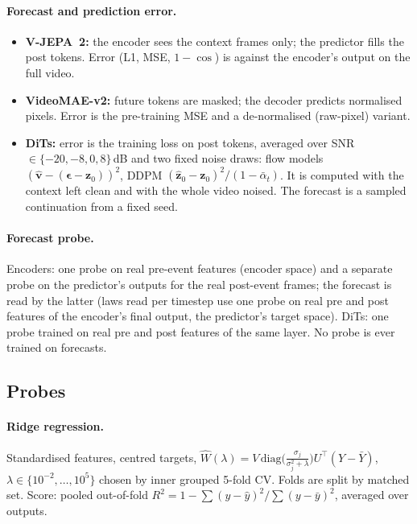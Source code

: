 \documentclass[10pt]{article}
\begin{document}
\paragraph{Forecast and prediction error.}
\begin{itemize}
\item \textbf{V-JEPA~2:} the encoder sees the context frames only; the predictor fills the post tokens. Error (L1,
MSE, $1-\cos$) is against the encoder's output on the full video.
\item \textbf{VideoMAE-v2:} future tokens are masked; the decoder predicts normalised pixels. Error is the
pre-training MSE and a de-normalised (raw-pixel) variant.
\item \textbf{DiTs:} error is the training loss on post tokens, averaged over SNR $\in\{-20,-8,0,8\}$\,dB and two
fixed noise draws: flow models $(\hat{\mathbf v}-(\boldsymbol\epsilon-\mathbf z_0))^2$, DDPM
$(\hat{\mathbf z}_0-\mathbf z_0)^2/(1-\bar\alpha_t)$. It is computed with the context left clean and with the whole video noised.
The forecast is a sampled continuation from a fixed seed.
\end{itemize}

\paragraph{Forecast probe.} Encoders: one probe on real pre-event features (encoder space) and a separate probe on the
predictor's outputs for the real post-event frames; the forecast is read by the latter (laws read per timestep use one
probe on real pre and post features of the encoder's final output, the predictor's target space). DiTs: one
probe trained on real pre and post features of the same layer. No probe is ever trained on forecasts.

\subsection{Probes}
\label{sec:probe}
\paragraph{Ridge regression.} Standardised features, centred targets,
$\hat W(\lambda)=V\,\mathrm{diag}\big(\frac{\sigma_j}{\sigma_j^2+\lambda}\big)U^\top(Y-\bar Y)$,
$\lambda\in\{10^{-2},\dots,10^5\}$ chosen by inner grouped 5-fold CV. Folds are split by matched set. Score:
pooled out-of-fold $R^2=1-\sum(y-\hat y)^2/\sum(y-\bar y)^2$, averaged over outputs.
\end{document}
